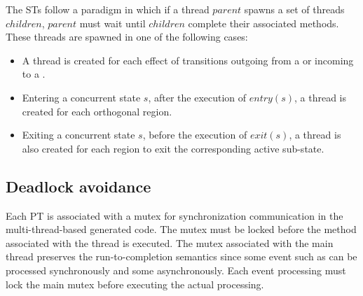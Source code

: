 The STs follow a paradigm in which if a thread $parent$ spawns a set of threads $children$, $parent$ must wait until $children$ complete their associated methods. These threads are spawned in one of the following cases:

\begin{itemize}
	\item A thread is created for each effect of transitions outgoing from a  or incoming to a .
	
	\item Entering a concurrent state $s$, after the execution of $entry(s)$, a thread is created for each orthogonal region. 
	
	\item Exiting a concurrent state $s$, before the execution of $exit(s)$, a thread is also created for each region to exit the corresponding active sub-state.
	
\end{itemize}

\subsection{Deadlock avoidance}
Each PT is associated with a mutex for synchronization communication in the multi-thread-based generated code. 
The mutex must be locked before the method associated with the thread is executed. 
The mutex associated with the main thread preserves the run-to-completion semantics since some event such as  can be processed synchronously and some asynchronously. Each event processing must lock the main mutex before executing the actual processing. 


